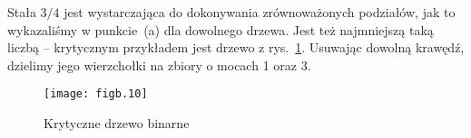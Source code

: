 \subproblem %
Stała $3/4$ jest wystarczająca do dokonywania zrównoważonych podziałów, jak to wykazaliśmy w punkcie~(a) dla dowolnego drzewa. Jest też najmniejszą taką liczbą -- krytycznym przykładem jest drzewo z rys.~\ref{fig:B-3b}. Usuwając dowolną krawędź, dzielimy jego wierzchołki na zbiory o mocach 1 oraz 3.
\begin{figure}[ht]
	\begin{center}
		\texttt{[image: figb.10]}
	\end{center}
	\caption{Krytyczne drzewo binarne} \label{fig:B-3b}
\end{figure}

\subproblem %

\endinput
